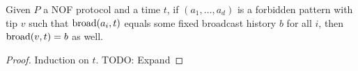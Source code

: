 \begin{lemma}
  \label{lem:mono-forbidden-pattern-tip}
  \leanok

  Given $P$ a NOF protocol and a time $t$, if $(a_1, \dots, a_d)$ is a forbidden pattern with tip $v$ such that $\operatorname{broad}(a_i, t)$ equals some fixed broadcast history $b$ for all $i$, then $\operatorname{broad}(v, t) = b$ as well.
\end{lemma}
\begin{proof}
  \leanok

  Induction on $t$. TODO: Expand
\end{proof}
